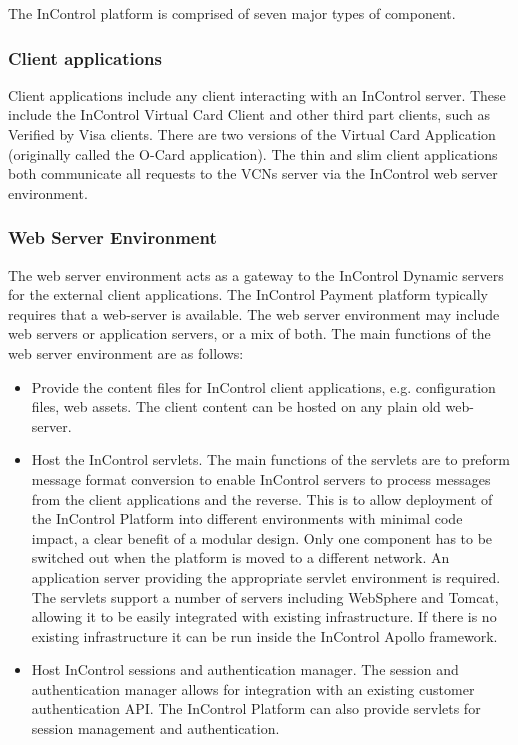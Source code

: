 \documentclass[a4paper, 11pt, titlepage]{article}
\begin{document}
The InControl platform is comprised of seven major types of component. 
\subsubsection{Client applications} 
Client applications include any client interacting with an InControl server. These include the InControl Virtual Card Client and other third part clients, such as Verified by Visa clients. There are two versions of the Virtual Card Application (originally called the O-Card application). The thin and slim client applications both communicate all requests to the VCNs server via the InControl web server environment. 
\subsubsection{Web Server Environment} 
The web server environment acts as a gateway to the InControl Dynamic servers for the external client applications. The InControl Payment platform typically requires that a web-server is available. The web server environment may include web servers or application servers, or a mix of both. The main functions of the web server environment are as follows: 
\begin{itemize} 
\item Provide the content files for InControl client applications, e.g. configuration files, web assets. The client content can be hosted on any plain old web-server. 
\item Host the InControl servlets. The main functions of the servlets are to preform message format conversion to enable InControl servers to process messages from the client applications and the reverse. This is to allow deployment of the InControl Platform into different environments with minimal code impact, a clear benefit of a modular design. Only one component has to be switched out when the platform is moved to a different network. An application server providing the appropriate servlet environment is required. The servlets support a number of servers including WebSphere and Tomcat, allowing it to be easily integrated with existing infrastructure. If there is no existing infrastructure it can be run inside the InControl Apollo framework.  
\item Host InControl sessions and authentication manager. The session and authentication manager allows for integration with an existing customer authentication API. The InControl Platform can also provide servlets for session management and authentication. 
\end{itemize} 
\end{document}
